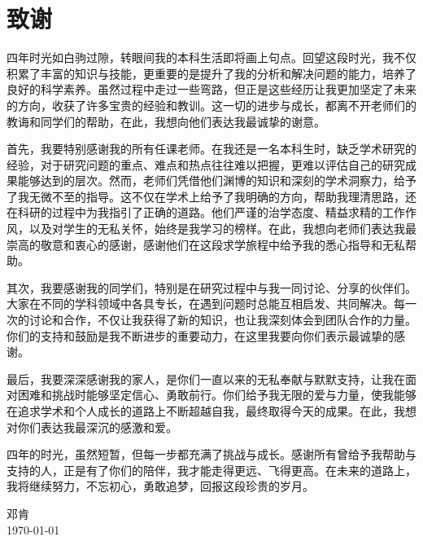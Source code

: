 
\chapter{致谢}

四年时光如白驹过隙，转眼间我的本科生活即将画上句点。回望这段时光，我不仅积累了丰富的知识与技能，更重要的是提升了我的分析和解决问题的能力，培养了良好的科学素养。虽然过程中走过一些弯路，但正是这些经历让我更加坚定了未来的方向，收获了许多宝贵的经验和教训。这一切的进步与成长，都离不开老师们的教诲和同学们的帮助，在此，我想向他们表达我最诚挚的谢意。

首先，我要特别感谢我的所有任课老师。在我还是一名本科生时，缺乏学术研究的经验，对于研究问题的重点、难点和热点往往难以把握，更难以评估自己的研究成果能够达到的层次。然而，老师们凭借他们渊博的知识和深刻的学术洞察力，给予了我无微不至的指导。这不仅在学术上给予了我明确的方向，帮助我理清思路，还在科研的过程中为我指引了正确的道路。他们严谨的治学态度、精益求精的工作作风，以及对学生的无私关怀，始终是我学习的榜样。在此，我想向老师们表达我最崇高的敬意和衷心的感谢，感谢他们在这段求学旅程中给予我的悉心指导和无私帮助。

其次，我要感谢我的同学们，特别是在研究过程中与我一同讨论、分享的伙伴们。大家在不同的学科领域中各具专长，在遇到问题时总能互相启发、共同解决。每一次的讨论和合作，不仅让我获得了新的知识，也让我深刻体会到团队合作的力量。你们的支持和鼓励是我不断进步的重要动力，在这里我要向你们表示最诚挚的感谢。

最后，我要深深感谢我的家人，是你们一直以来的无私奉献与默默支持，让我在面对困难和挑战时能够坚定信心、勇敢前行。你们给予我无限的爱与力量，使我能够在追求学术和个人成长的道路上不断超越自我，最终取得今天的成果。在此，我想对你们表达我最深沉的感激和爱。

四年的时光，虽然短暂，但每一步都充满了挑战与成长。感谢所有曾给予我帮助与支持的人，正是有了你们的陪伴，我才能走得更远、飞得更高。在未来的道路上，我将继续努力，不忘初心，勇敢追梦，回报这段珍贵的岁月。


\vskip 108pt
\begin{flushright}
    邓肯\makebox[1cm]{} \\
    \today
\end{flushright}

